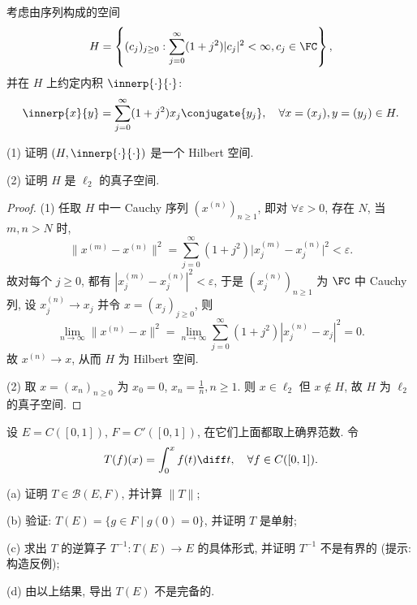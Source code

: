 \documentclass{mathexercise}
\begin{document}
\begin{exercise}
    考虑由序列构成的空间
    \[
    H=\left\{(c_j)_{j\geq 0}: \sum_{j=0}^{\infty}(1+j^2)|c_j|^2<\infty, c_j\in\FC\right\},
    \]
    并在 $H$ 上约定内积 $\innerp{\cdot}{\cdot}$:
    \[
    \innerp{x}{y}=\sum_{j=0}^{\infty}(1+j^2) x_j \conjugate{y_j}, \quad\forall x=(x_j), y=(y_{j}) \in H.
    \]

    (1) 证明 $(H,\innerp{\cdot}{\cdot})$ 是一个 Hilbert 空间.

    (2) 证明 $H$ 是 $\ell_{2}$ 的真子空间.
\end{exercise}

\begin{proof}
    (1) 任取 $H$ 中一 Cauchy 序列 $(x^{(n)})_{n\geq 1}$, 即对 $\forall\varepsilon>0$,
    存在 $N$, 当 $m,n>N$ 时,
    \[\|x^{(m)}-x^{(n)}\|^2=\sum_{j=0}^{\infty}(1+j^2)\bigl|x^{(m)}_j-x^{(n)}_j\bigr|^2<\varepsilon.\]
    故对每个 $j\geq 0$, 都有 $|x^{(m)}_j-x^{(n)}_j|^2<\varepsilon$, 于是 $(x^{(n)}_j)_{n\geq 1}$
    为 $\FC$ 中 Cauchy 列, 设 $x^{(n)}_j\to x_j$ 并令 $x=(x_j)_{j\geq 0}$, 则
    \[\lim_{n\to\infty}\|x^{(n)}-x\|^2=\lim_{n\to\infty}\sum_{j=0}^{\infty}(1+j^2)|x^{(n)}_j-x_j|^2=0.\]
    故 $x^{(n)}\to x$, 从而 $H$ 为 Hilbert 空间.

    (2) 取 $x=(x_n)_{n\geq 0}$ 为 $x_0=0$, $x_n=\frac{1}{n},n\geq 1$. 则 $x\in\ell_2$ 但
    $x\notin H$, 故 $H$ 为 $\ell_2$ 的真子空间.
\end{proof}



\begin{exercise}
    设 $E=C([0,1])$, $F=C'([0,1])$, 在它们上面都取上确界范数. 令
    \[
    T(f)(x)=\int_0^x f(t)\diff t, \quad\forall f \in C([0,1]).
    \]

    (a) 证明 $T\in\mathcal{B}(E,F)$, 并计算 $\|T\|$;

    (b) 验证: $T(E)=\{g\in F\mid g(0)=0\}$, 并证明 $T$ 是单射;

    (c) 求出 $T$ 的逆算子 $T^{-1}:T(E)\rightarrow E$ 的具体形式, 并证明 $T^{-1}$ 不是有界的 (提示: 构造反例);

    (d) 由以上结果, 导出 $T(E)$ 不是完备的.
\end{exercise}
\end{document}
